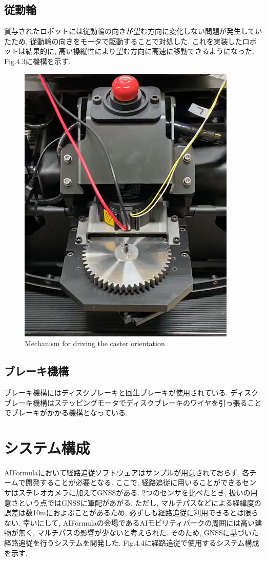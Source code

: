 \subsection{従動輪}
貸与されたロボットには従動輪の向きが望む方向に変化しない問題が発生していたため, 従動輪の向きをモータで駆動することで対処した.
これを実装したロボットは結果的に, 高い操縦性により望む方向に高速に移動できるようになった.
Fig.4.3に機構を示す.


\begin{figure}[H]
  \centering
 \includegraphics[keepaspectratio, scale=0.5]
      {images/caster.png}
 \caption{Mechanism for driving the caster orientation}
 \label{fig:Mechanism for driving the caster orientation}
\end{figure}

\subsection{ブレーキ機構}
ブレーキ機構にはディスクブレーキと回生ブレーキが使用されている.
ディスクブレーキ機構はステッピングモータでディスクブレーキのワイヤを引っ張ることでブレーキがかかる機構となっている.

\section{システム構成}
AIFormulaにおいて経路追従ソフトウェアはサンプルが用意されておらず, 各チームで開発することが必要となる.
ここで, 経路追従に用いることができるセンサはステレオカメラに加えてGNSSがある.
2つのセンサを比べたとき, 扱いの用意さという点ではGNSSに軍配があがる.
ただし, マルチパスなどによる経緯度の誤差は数10mにおよぶことがあるため, 必ずしも経路追従に利用できるとは限らない.
幸いにして, AIFormulaの会場であるAIモビリティパークの周囲には高い建物が無く, マルチパスの影響が少ないと考えられた.
そのため, GNSSに基づいた経路追従を行うシステムを開発した.
Fig.4.4に経路追従で使用するシステム構成を示す.

